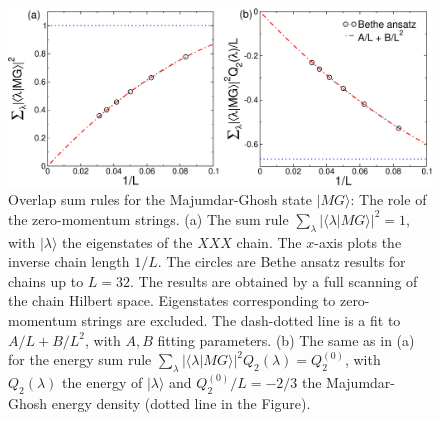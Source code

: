 \documentclass[11pt]{iopart}
\begin{document}
\begin{figure}[t]
\begin{center}
\includegraphics[width=.9\textwidth]{./draft_figs/Dimer}
\end{center}
\caption{Overlap sum rules for the Majumdar-Ghosh state $|MG\rangle$: 
 The role of the zero-momentum strings. (a) The sum rule $\sum_{\lambda}|
 \langle\lambda|MG\rangle|^2=1$, with $|\lambda\rangle$ the eigenstates   
 of the $XXX$ chain. The $x$-axis plots the inverse chain length $1/L$. 
 The circles are Bethe ansatz results for chains up to $L=32$. The results 
 are obtained by a full scanning of the chain Hilbert space. Eigenstates 
 corresponding to zero-momentum strings are excluded. The dash-dotted line 
 is a fit to $A/L+B/L^2$, with $A,B$ fitting parameters. (b) The same as 
 in (a) for the energy sum rule $\sum_{\lambda}|\langle\lambda|MG\rangle
 |^2Q_2(\lambda)=Q_2^{(0)}$, with $Q_2(\lambda)$  the energy of $|\lambda
 \rangle$ and $Q_2^{(0)}/L=-2/3$ the Majumdar-Ghosh energy density (dotted 
 line in the Figure). 
}
\label{fig2:dimer-sr}
\end{figure}
\end{document}
